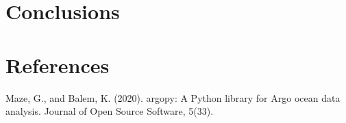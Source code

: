 \documentclass{article}
\begin{document}
 

\section{Conclusions}

\section{References}

Maze, G., and Balem, K. (2020). argopy: A Python library for Argo ocean data analysis. Journal of Open Source Software, 5(33).
\end{document}
